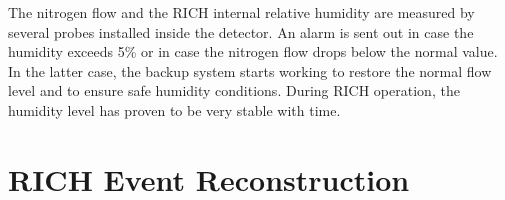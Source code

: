 \documentclass[5p,times,twocolumn]{elsarticle}
\begin{document}
The nitrogen flow and the RICH internal relative humidity are measured by several probes installed inside the
detector.
An alarm is sent out in case the humidity exceeds 5\% or in case the nitrogen flow drops below the normal value. 
In the latter case, the backup system starts working to restore the normal flow level and to ensure safe humidity
conditions. During RICH operation, the humidity level has proven to be very stable with time.


\section{RICH Event Reconstruction}
\label{sec:RICHReco}
\end{document}
